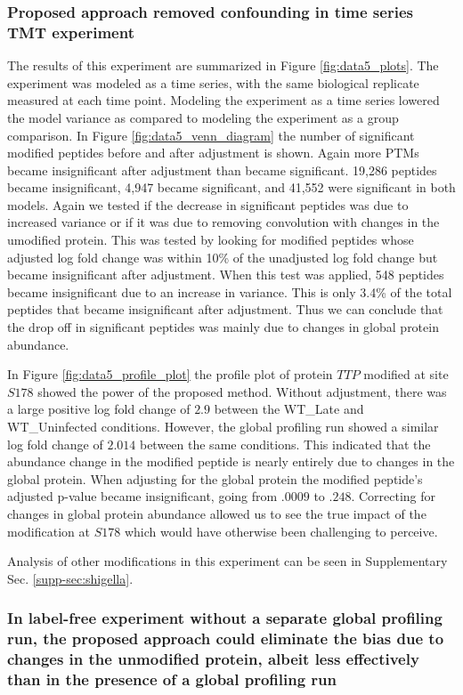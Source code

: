 \documentclass[mcp]{article}
\numberwithin{table}{section}
\begin{document}
\subsubsection*{Proposed approach removed confounding in time series TMT experiment}

The results of this experiment are summarized in Figure \ref{fig:data5_plots}. The experiment was modeled as a time series, with the same biological replicate measured at each time point. Modeling the experiment as a time series lowered the model variance as compared to modeling the experiment as a group comparison. In Figure \ref{fig:data5_venn_diagram} the number of significant modified peptides before and after adjustment is shown. Again more PTMs became insignificant after adjustment than became significant. 19,286 peptides became insignificant, 4,947 became significant, and 41,552 were significant in both models. Again we tested if the decrease in significant peptides was due to increased variance or if it was due to removing convolution with changes in the umodified protein. This was tested by looking for modified peptides whose adjusted log fold change was within 10\% of the unadjusted log fold change but became insignificant after adjustment. When this test was applied, 548 peptides became insignificant due to an increase in variance. This is only 3.4\% of the total peptides that became insignificant after adjustment. Thus we can conclude that the drop off in significant peptides was mainly due to changes in global protein abundance.

In Figure \ref{fig:data5_profile_plot} the profile plot of protein $TTP$ modified at site $S178$ showed the power of the proposed method. Without adjustment, there was a large positive log fold change of $2.9$ between the WT\_Late and WT\_Uninfected conditions. However, the global profiling run showed a similar log fold change of $2.014$ between the same conditions. This indicated that the abundance change in the modified peptide is nearly entirely due to changes in the global protein. When adjusting for the global protein the modified peptide's adjusted p-value became insignificant, going from $.0009$ to $.248$. Correcting for changes in global protein abundance allowed us to see the true impact of the modification at $S178$ which would have otherwise been challenging to perceive.

Analysis of other modifications in this experiment can be seen in Supplementary Sec. \ref{supp-sec:shigella}.

\subsubsection*{In label-free experiment without a separate global profiling run, the proposed approach could eliminate the bias due to changes in the unmodified protein, albeit less effectively than in the presence of a global profiling run}
\end{document}
